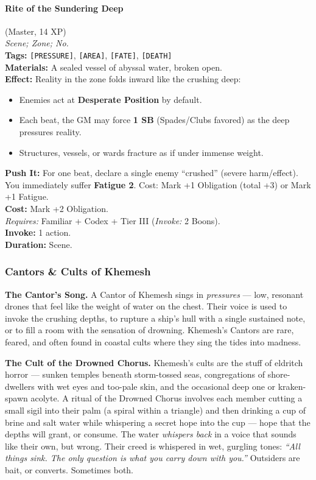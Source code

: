 \paragraph{Rite of the Sundering Deep} (Master, 14 XP) \hfill \\
\emph{Scene; Zone; No.} \\
\textbf{Tags:} \texttt{[PRESSURE]}, \texttt{[AREA]}, \texttt{[FATE]}, \texttt{[DEATH]} \\
\textbf{Materials:} A sealed vessel of abyssal water, broken open. \\
\textbf{Effect:} Reality in the zone folds inward like the crushing deep:
\begin{itemize}
  \item Enemies act at \textbf{Desperate Position} by default.
  \item Each beat, the GM may force \textbf{1 SB} (Spades/Clubs favored) as the deep pressures reality.
  \item Structures, vessels, or wards fracture as if under immense weight.
\end{itemize}
\textbf{Push It:} For one beat, declare a single enemy ``crushed'' (severe harm/effect). You immediately suffer \textbf{Fatigue 2}. Cost: Mark +1 Obligation (total +3) or Mark +1 Fatigue. \\
\textbf{Cost:} Mark +2 Obligation. \\
\textit{Requires:} Familiar + Codex + Tier III (\textit{Invoke:} 2 Boons). \\
\textbf{Invoke:} 1 action. \\
\textbf{Duration:} Scene.

\subsubsection*{Cantors \& Cults of Khemesh}

\textbf{The Cantor's Song.} A Cantor of Khemesh sings in \textit{pressures} --- low, resonant drones that feel like the weight of water on the chest. Their voice is used to invoke the crushing depths, to rupture a ship's hull with a single sustained note, or to fill a room with the sensation of drowning. Khemesh's Cantors are rare, feared, and often found in coastal cults where they sing the tides into madness.

\textbf{The Cult of the Drowned Chorus.} Khemesh's cults are the stuff of eldritch horror --- sunken temples beneath storm-tossed seas, congregations of shore-dwellers with wet eyes and too-pale skin, and the occasional deep one or kraken-spawn acolyte. A ritual of the Drowned Chorus involves each member cutting a small sigil into their palm (a spiral within a triangle) and then drinking a cup of brine and salt water while whispering a secret hope into the cup --- hope that the depths will grant, or consume. The water \textit{whispers back} in a voice that sounds like their own, but wrong. Their creed is whispered in wet, gurgling tones: \textit{``All things sink. The only question is what you carry down with you.''} Outsiders are bait, or converts. Sometimes both.

